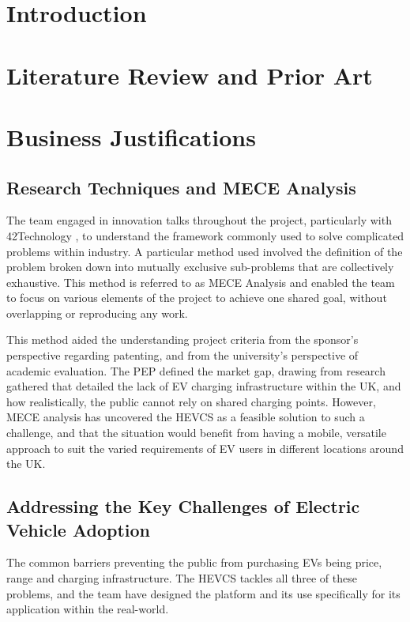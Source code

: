 \documentclass [12pt]{article}
\begin{document}
\section{Introduction}
\setcounter{page}{1}

\newpage
\section{Literature Review and Prior Art}


\newpage
\section{Business Justifications}

\subsection{Research Techniques and MECE Analysis}

The team engaged in innovation talks throughout the project, particularly with 42Technology \cite{42T}, to understand the framework commonly used to solve complicated problems within industry. A particular method used involved the definition of the problem broken down into mutually exclusive sub-problems that are collectively exhaustive. This method is referred to as MECE Analysis and enabled the team to focus on various elements of the project to achieve one shared goal, without overlapping or reproducing any work. 

This method aided the understanding project criteria from the sponsor’s perspective regarding patenting, and from the university’s perspective of academic evaluation. The PEP defined the market gap, drawing from research gathered that detailed the lack of EV charging infrastructure within the UK, and how realistically, the public cannot rely on shared charging points. However, MECE analysis has uncovered the HEVCS as a feasible solution to such a challenge, and that the situation would benefit from having a mobile, versatile approach to suit the varied requirements of EV users in different locations around the UK. 

\subsection{Addressing the Key Challenges of Electric Vehicle Adoption}

The common barriers preventing the public from purchasing EVs being price, range and charging infrastructure. The HEVCS tackles all three of these problems, and the team have designed the platform and its use specifically for its application within the real-world. 
\end{document}

